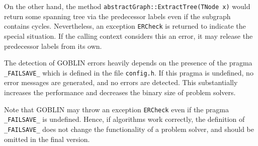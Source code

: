 \documentclass[a4paper,11pt,twoside]{book}
\begin{document}
\begin{multicols}{2}
On the other hand, the method \verb/abstractGraph::ExtractTree(TNode x)/
would return some spanning tree via the predecessor labels even if the
subgraph contains cycles. Nevertheless, an exception \verb/ERCheck/ is returned
to indicate the special situation. If the calling context considers this an
error, it may release the predecessor labels from its own.

The detection of GOBLIN errors heavily depends on the presence of the pragma
\verb/_FAILSAVE_/ which is defined in the file \verb/config.h/. If this pragma
is undefined, no error messages are generated, and no errors are detected.
This substantially increases the performance and decreases the binary size
of problem solvers.

Note that GOBLIN may throw an exception \verb/ERCheck/ even if the pragma
\verb/_FAILSAVE_/ is undefined. Hence, if algorithms work correctly, the
definition of \verb/_FAILSAVE_/ does not change the functionality of a problem
solver, and should be omitted in the final version.



\end{multicols}
\end{document}
